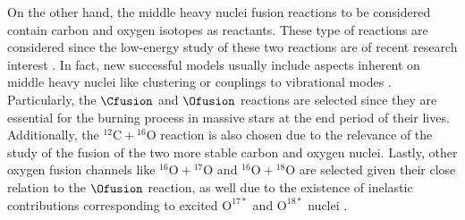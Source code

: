 \documentclass[openany]{book}
\begin{document}
 On the other hand, the middle heavy nuclei fusion reactions to be considered contain carbon and oxygen isotopes as reactants. These type of reactions are considered since the low-energy study of these two reactions are of recent research interest \cite{mukhamedzhanov_pang_kadyrov_2019, taniguchi_kimura_2021, torilov_maltsev_zherebchevsky_2021}. In fact, new successful models usually include aspects inherent on middle heavy nuclei like clustering \cite{assuncao_descouvemont_2016} or couplings to vibrational modes \cite{duarte_gasques_oliveira_zagatto_chamon_medina_added_seale_alcantara-nunez_rossi_et_2015}. \\
 
 Particularly, the $\Cfusion$  and $\Ofusion$ reactions are selected since they are essential for the burning process in massive stars at the end period of their lives. Additionally, the $\mathrm{{}^{12}C + {}^{16}O}$ reaction is also chosen due to the relevance of the study of the fusion of the two more stable carbon and oxygen nuclei. Lastly, other oxygen fusion channels like $\mathrm{{}^{16}O + {}^{17}O}$ and $\mathrm{{}^{16}O + {}^{18}O}$ are selected given their close relation to the $\Ofusion$ reaction, as well due to the existence of inelastic contributions corresponding to excited $\mathrm{O^{17*}}$ and $\mathrm{O^{18*}}$ nuclei \cite{thomas_chen_hinds_meredith_olson_1986}.   \\





 
\end{document}
